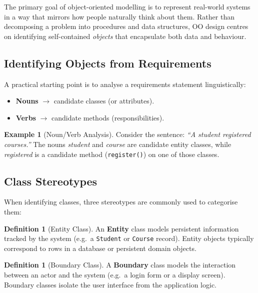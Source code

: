 \documentclass[11pt, a4paper, notitlepage]{report}
\theoremstyle{definition}
\newtheorem{definition}[theorem]{Definition}
\theoremstyle{remark}
\theoremstyle{definition}
\newtheorem{example}[theorem]{Example}
\begin{document}
The primary goal of object-oriented modelling is to represent real-world systems in a way
that mirrors how people naturally think about them. Rather than decomposing a problem into
procedures and data structures, OO design centres on identifying self-contained \emph{objects}
that encapsulate both data and behaviour.

\subsection{Identifying Objects from Requirements}

A practical starting point is to analyse a requirements statement linguistically:
\begin{itemize}
  \item \textbf{Nouns} $\longrightarrow$ candidate classes (or attributes).
  \item \textbf{Verbs} $\longrightarrow$ candidate methods (responsibilities).
\end{itemize}

\begin{example}[Noun/Verb Analysis]
\label{ex:ch8-noun-verb}
Consider the sentence: \emph{``A student registered courses.''} The nouns
\emph{student} and \emph{course} are candidate entity classes, while
\emph{registered} is a candidate method (\texttt{register()}) on one of those classes.
\end{example}

\subsection{Class Stereotypes}

When identifying classes, three stereotypes are commonly used to categorise them:

\begin{definition}[Entity Class]
\label{def:ch8-entity}
An \textbf{Entity} class models persistent information tracked by the system (e.g.\ a
\texttt{Student} or \texttt{Course} record). Entity objects typically correspond to rows
in a database or persistent domain objects.
\end{definition}

\begin{definition}[Boundary Class]
\label{def:ch8-boundary}
A \textbf{Boundary} class models the interaction between an actor and the system (e.g.\ a
login form or a display screen). Boundary classes isolate the user interface from the
application logic.
\end{definition}
\end{document}
